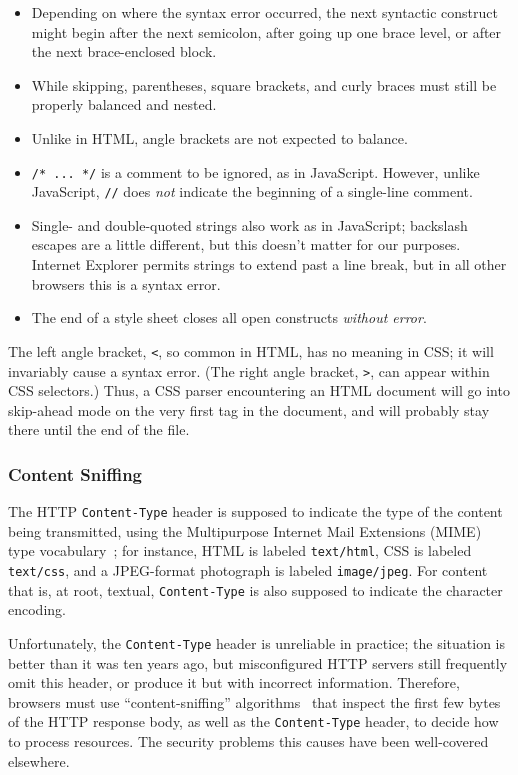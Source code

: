 \documentclass{acm_proc_article-sp}
\begin{document}
\begin{itemize}
\item Depending on where the syntax error occurred, the next syntactic
  construct might begin after the next semicolon, after going up one
  brace level, or after the next brace-enclosed block.
\item While skipping, parentheses, square brackets, and curly braces
  must still be properly balanced and nested.
\item Unlike in HTML, angle brackets are not expected to balance.
\item \verb|/* ... */| is a comment to be ignored, as in JavaScript.
  However, unlike JavaScript, \verb|//| does \emph{not} indicate the
  beginning of a single-line comment.
\item Single- and double-quoted strings also work as in JavaScript;
  backslash escapes are a little different, but this doesn't matter
  for our purposes.  Internet Explorer permits strings to extend past
  a line break, but in all other browsers this is a syntax error.
\item The end of a style sheet closes all open constructs
  \emph{without error}.
\end{itemize}

The left angle bracket, \texttt{<}, so common in HTML, has no meaning
in CSS; it will invariably cause a syntax error.  (The right angle
bracket, \texttt{>}, can appear within CSS selectors.)  Thus, a CSS
parser encountering an HTML document will go into skip-ahead mode on
the very first tag in the document, and will probably stay there until
the end of the file.

\subsubsection{Content Sniffing} \label{sec:mime}
The HTTP \texttt{Content-Type} header is supposed to indicate the type
of the content being transmitted, using the Multipurpose Internet Mail
Extensions (MIME) type vocabulary~\cite{mime}; for instance, HTML is
labeled \texttt{text/html}, CSS is labeled \texttt{text/css}, and a
JPEG-format photograph is labeled \texttt{image/jpeg}.  For content
that is, at root, textual, \texttt{Content-Type} is also supposed to
indicate the character encoding.

Unfortunately, the \texttt{Content-Type} header is unreliable in
practice; the situation is better than it was ten years ago, but
misconfigured HTTP servers still frequently omit this header, or
produce it but with incorrect information.  Therefore, browsers must
use “content-sniffing” algorithms~\cite{securecontentsniffing} that
inspect the first few bytes of the HTTP response body, as well as the
\texttt{Content-Type} header, to decide how to process resources.  The
security problems this causes have been well-covered elsewhere.
\end{document}
